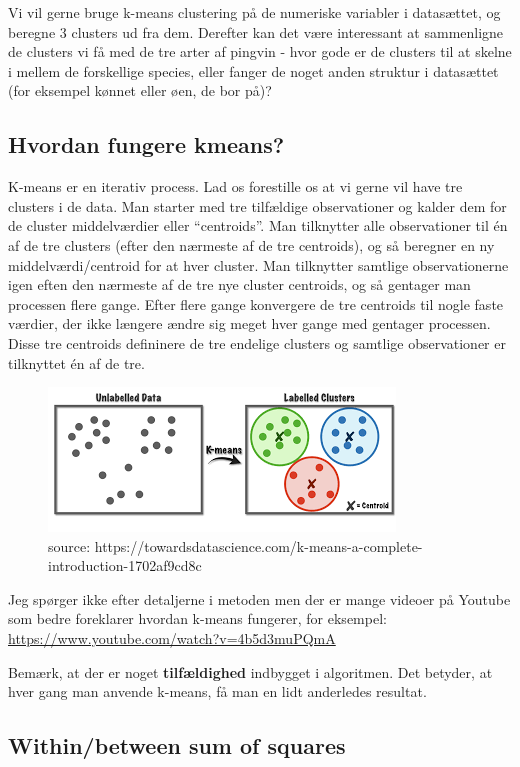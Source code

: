 \documentclass[
]{book}
\begin{document}
Vi vil gerne bruge k-means clustering på de numeriske variabler i datasættet, og beregne 3 clusters ud fra dem. Derefter kan det være interessant at sammenligne de clusters vi få med de tre arter af pingvin - hvor gode er de clusters til at skelne i mellem de forskellige species, eller fanger de noget anden struktur i datasættet (for eksempel kønnet eller øen, de bor på)?

\hypertarget{hvordan-fungere-kmeans}{%
\subsection{Hvordan fungere kmeans?}\label{hvordan-fungere-kmeans}}

K-means er en iterativ process. Lad os forestille os at vi gerne vil have tre clusters i de data. Man starter med tre tilfældige observationer og kalder dem for de cluster middelværdier eller ``centroids''. Man tilknytter alle observationer til én af de tre clusters (efter den nærmeste af de tre centroids), og så beregner en ny middelværdi/centroid for at hver cluster. Man tilknytter samtlige observationerne igen eften den nærmeste af de tre nye cluster centroids, og så gentager man processen flere gange. Efter flere gange konvergere de tre centroids til nogle faste værdier, der ikke længere ændre sig meget hver gange med gentager processen. Disse tre centroids defininere de tre endelige clusters og samtlige observationer er tilknyttet én af de tre.

\begin{figure}
\includegraphics[width=0.5\linewidth]{plots/kmeans} \caption{source: https://towardsdatascience.com/k-means-a-complete-introduction-1702af9cd8c}\label{fig:unnamed-chunk-497}
\end{figure}

Jeg spørger ikke efter detaljerne i metoden men der er mange videoer på Youtube som bedre foreklarer hvordan k-means fungerer, for eksempel: \url{https://www.youtube.com/watch?v=4b5d3muPQmA}

Bemærk, at der er noget \textbf{tilfældighed} indbygget i algoritmen. Det betyder, at hver gang man anvende k-means, få man en lidt anderledes resultat.

\hypertarget{withinbetween-sum-of-squares}{%
\subsection{Within/between sum of squares}\label{withinbetween-sum-of-squares}}
\end{document}
